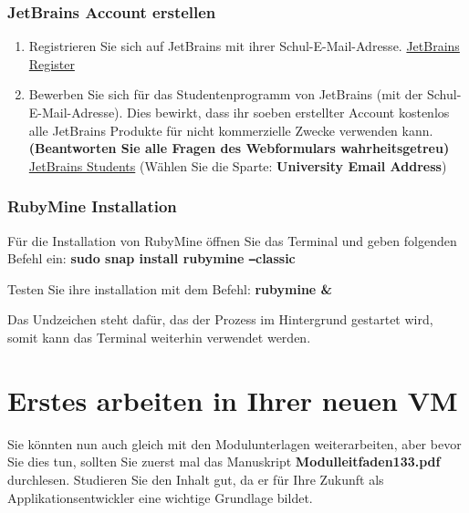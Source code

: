 \subsubsection{JetBrains Account erstellen}\label{subsubsec:jetbrainsAccount}
\begin{frame}[fragile]
    \begin{enumerate}
        \item Registrieren Sie sich auf JetBrains mit ihrer Schul-E-Mail-Adresse.
        \href{https://account.jetbrains.com/login}{JetBrains Register}
        \item Bewerben Sie sich für das Studentenprogramm von JetBrains (mit der Schul-E-Mail-Adresse).
        Dies bewirkt, dass ihr soeben erstellter Account kostenlos alle JetBrains Produkte für nicht kommerzielle Zwecke verwenden kann.
        \textbf{(Beantworten Sie alle Fragen des Webformulars wahrheitsgetreu)}
        \href{https://www.jetbrains.com/shop/eform/students}{JetBrains Students}
        (Wählen Sie die Sparte: \textbf{University Email Address})
    \end{enumerate}
\end{frame}

\subsubsection{RubyMine Installation}\label{subsubsec:RubyMine}
\begin{frame}[fragile]
    Für die Installation von RubyMine öffnen Sie das Terminal und geben folgenden Befehl ein:\newline
    \textbf{sudo snap install rubymine \texttt{--}classic}

    Testen Sie ihre installation mit dem Befehl: \textbf{rubymine \&}

    Das Undzeichen steht dafür, das der Prozess im Hintergrund gestartet wird, somit kann das Terminal weiterhin verwendet werden.
\end{frame}

\newpage
\section{Erstes arbeiten in Ihrer neuen VM}\label{sec:erstesarbeiten}
\begin{frame}[fragile]
    Sie könnten nun auch gleich mit den Modulunterlagen weiterarbeiten, aber bevor Sie dies tun, sollten Sie zuerst mal
    das Manuskript \textbf{Modulleitfaden\textunderscore 133.pdf} durchlesen.
    Studieren Sie den Inhalt gut, da er für Ihre Zukunft als Applikationsentwickler eine wichtige Grundlage bildet.
\end{frame}

